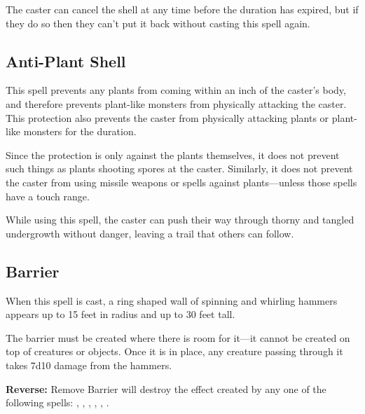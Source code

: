 \begin{multicols*}{2}
The caster can cancel the shell at any time before the duration has expired, but if they do so then they can’t put it back without casting this spell again.

\subsection{Anti-Plant Shell}\label{spell:Anti-Plant Shell}

This spell prevents any plants from coming within an inch of the caster’s body, and therefore prevents plant-like monsters from physically attacking the caster. This protection also prevents the caster from physically attacking plants or plant-like monsters for the duration.

Since the protection is only against the plants themselves, it does not prevent such things as plants shooting spores at the caster. Similarly, it does not prevent the caster from using missile weapons or spells against plants—unless those spells have a touch range.

While using this spell, the caster can push their way through thorny and tangled undergrowth without danger, leaving a trail that others can follow.

\subsection{Barrier}\label{spell:Barrier}

When this spell is cast, a ring shaped wall of spinning and whirling hammers appears up to 15 feet in radius and up to 30 feet tall.

The barrier must be created where there is room for it—it cannot be created on top of creatures or objects. Once it is in place, any creature passing through it takes 7d10 damage from the hammers.

\textbf{Reverse:} \hypertarget{spell:Remove Barrier}{Remove Barrier} will destroy the effect created by any one of the following spells: , , , , , .


\end{multicols*}
